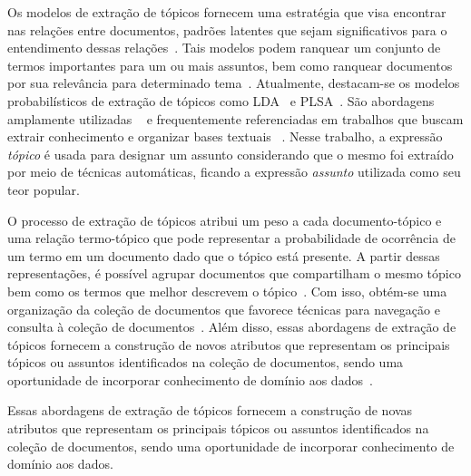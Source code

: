 

Os modelos de extração de tópicos fornecem uma estratégia que visa encontrar nas relações entre documentos, padrões latentes que sejam significativos para o entendimento dessas relações~\cite{Wei2007}. Tais modelos podem ranquear um conjunto de termos importantes para um ou mais assuntos, bem como ranquear documentos por sua relevância para determinado tema~\cite{Faleiros2016,Xing2009}.
Atualmente, destacam-se os modelos probabilísticos de extração de tópicos como LDA~\cite{Blei2003} e PLSA~\cite{Hofmann1999}. São abordagens amplamente utilizadas ~\cite{DZhu20122} e frequentemente referenciadas em trabalhos que buscam extrair conhecimento e organizar bases textuais ~\cite{Aggarwal2018, OCallaghan2015, Steyvers2007}.  
%
%
Nesse trabalho, a expressão \textit{tópico} é usada para designar um assunto considerando que o mesmo foi extraído por meio de técnicas automáticas, ficando a expressão \textit{assunto} utilizada como seu teor popular. 

O processo de extração de tópicos atribui um peso a cada documento-tópico e uma relação termo-tópico que pode representar a probabilidade de ocorrência de um termo em um documento dado que o tópico está presente. A partir dessas representações, é possível agrupar documentos que compartilham o mesmo tópico bem como os termos que melhor descrevem o tópico~\cite{Aggarwal2018}. Com isso, obtém-se uma organização da coleção de documentos que favorece técnicas para navegação e consulta à coleção de documentos~\cite{Maracini2010}. 
% 
Além disso, essas abordagens de extração de tópicos fornecem a construção de novos atributos que representam os principais tópicos ou assuntos identificados na coleção de documentos, sendo uma oportunidade de incorporar conhecimento de domínio aos dados~\cite{Guyon2003}. 







Essas abordagens de extração de tópicos fornecem a construção de novas atributos que representam os principais tópicos ou assuntos identificados na coleção de documentos, sendo uma oportunidade de incorporar conhecimento de domínio aos dados. 

